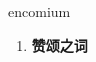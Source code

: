 
\begin{frame}
{\huge encomium}
\begin{center}
\begin{enumerate}\Large
  \item \textbf{赞颂之词}
\end{enumerate}
\end{center}
\end{frame}
